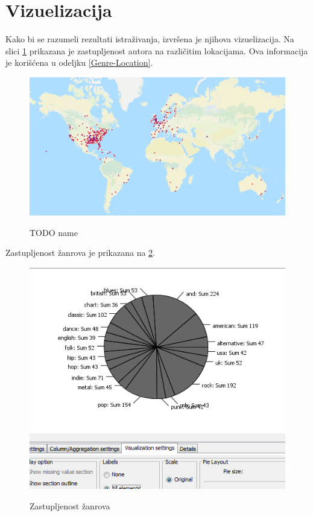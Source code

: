 \section{Vizuelizacija}
\label{sec:Vizuelizacija}
Kako bi se razumeli rezultati istra\v{z}ivanja, izvr\v{s}ena je njihova vizuelizacija. Na slici \ref{fig:Geolokacija} prikazana je zastupljenost autora na razli\v{c}itim lokacijama. Ova informacija je kori\v{s}\'c{}ena u odeljku \ref{Genre-Location}.

\begin{figure}[h]
    \includegraphics[scale=0.45]{resources/Geolokacija.png}
    \label{fig:Geolokacija}
    \caption{TODO name}
\end{figure}


Zastupljenost \v{z}anrova je prikazana na \ref{fig:ZastupljenostZanrova}.
\begin{figure}[h]
    \includegraphics[scale=0.6]{resources/ZastupljenostZanrova.png}
    \label{fig:ZastupljenostZanrova}
    \caption{Zastupljenost \v{z}anrova}
\end{figure}


